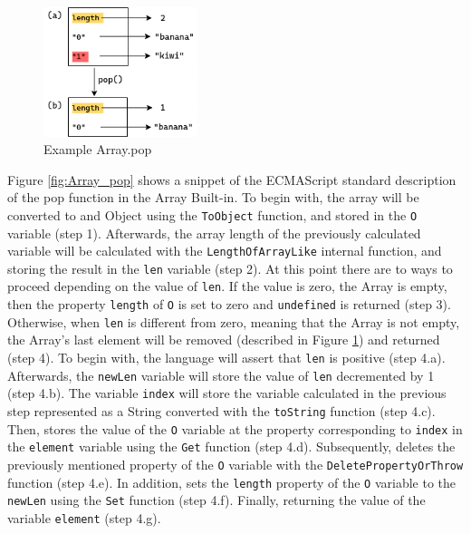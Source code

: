 \documentclass[runningheads]{llncs}
\begin{document}
\begin{figure}[ht]
    \centering
    \includegraphics[width=0.4\textwidth]{images/array_pop_example.png}
    \caption{Example Array.pop}
    \label{fig:Array_pop_example}
\end{figure}
Figure \ref{fig:Array_pop} shows a snippet of the ECMAScript standard description of the pop function in the Array Built-in. To begin with, the array will be converted to and Object using the \texttt{ToObject} function, and stored in the \texttt{O} variable (step 1).
Afterwards, the array length of the previously calculated variable will be calculated with the \texttt{LengthOfArrayLike} internal function, and storing the result in the \texttt{len} variable (step 2).
At this point there are to ways to proceed depending on the value of \texttt{len}. If the value is zero, the Array is empty, then the property \texttt{length} of \texttt{O} is set to zero and \texttt{undefined} is returned (step 3).
Otherwise, when \texttt{len} is different from zero, meaning that the Array is not empty, the Array's last element will be removed (described in Figure \ref{fig:Array_pop_example}) and returned (step 4).
To begin with, the language will assert that \texttt{len} is positive (step 4.a).
Afterwards, the \texttt{newLen} variable will store the value of \texttt{len} decremented by 1 (step 4.b).
The variable \texttt{index} will store the variable calculated in the previous step represented as a String converted with the \texttt{toString} function (step 4.c).
Then, stores the value of the \texttt{O} variable at the property corresponding to \texttt{index} in the \texttt{element} variable using the \texttt{Get} function (step 4.d).
Subsequently, deletes the previously mentioned property of the \texttt{O} variable with the \texttt{DeletePropertyOrThrow} function (step 4.e).
In addition, sets the \texttt{length} property of the \texttt{O} variable  to the \texttt{newLen} using the \texttt{Set} function (step 4.f).
Finally, returning the value of the variable \texttt{element} (step 4.g).
\end{document}
